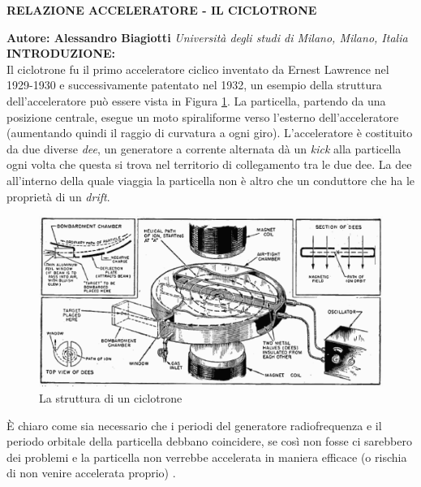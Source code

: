 \documentclass[a4paper,10pt]{article}
\begin{document}
\noindent
\begin{center}
	\textbf{{\Large RELAZIONE ACCELERATORE - IL CICLOTRONE}} \\
\end{center}

\noindent
\textbf{Autore: Alessandro Biagiotti} \hfill \textit{Università degli studi di Milano, Milano,
	Italia}
\\

\makeatletter\def\@currentlabel{\texttt{(I)}}\makeatother
\label{sec:intro}
\noindent
\textbf{INTRODUZIONE:}
\\
Il ciclotrone fu il primo acceleratore ciclico inventato da Ernest Lawrence nel 1929-1930 e
successivamente patentato nel 1932, un esempio della struttura dell'acceleratore può essere vista
in Figura \ref{fig:cyclotron}. La particella, partendo da una posizione centrale, esegue un
moto spiraliforme verso l'esterno dell'acceleratore (aumentando quindi il raggio di curvatura a ogni
giro). L'acceleratore è costituito da due diverse \emph{dee}, un generatore a corrente alternata dà
un \emph{kick} alla particella ogni volta che questa si trova nel territorio di collegamento tra le
due dee. La dee all'interno della quale viaggia la particella non è altro che un conduttore che ha
le proprietà di un \emph{drift}.

\begin{figure}[h!]
	\centering

	\includegraphics[scale=0.35]{fig/Cyclotron-diagram.png}
	\caption{
		La struttura di un ciclotrone
	}\label{fig:cyclotron}
\end{figure}

È chiaro come sia necessario che i periodi del generatore radiofrequenza e il periodo orbitale della
particella debbano coincidere, se così non fosse ci sarebbero dei problemi e la particella non
verrebbe accelerata in maniera efficace (o rischia di non venire accelerata proprio) \cite{bellomo}.
\end{document}
